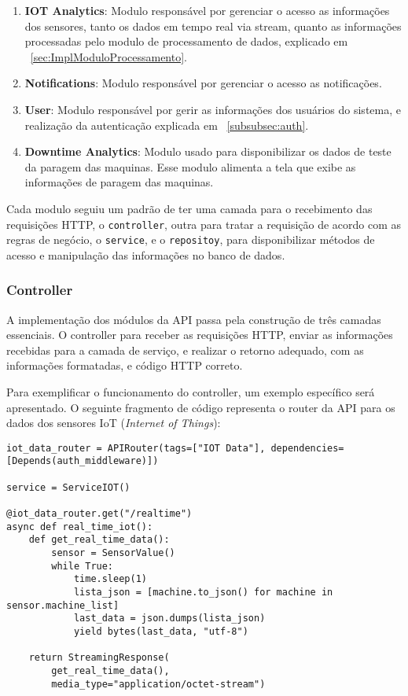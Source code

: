 \begin{enumerate}
    \item \textbf{IOT Analytics}: Modulo responsável por gerenciar o acesso as informações dos sensores, tanto os dados em tempo real via stream, quanto as informações processadas pelo modulo de processamento de dados, explicado em ~\ref{sec:ImplModuloProcessamento}.
    \item \textbf{Notifications}: Modulo responsável por gerenciar o acesso as notificações.
    \item \textbf{User}: Modulo responsável por gerir as informações dos usuários do sistema, e realização da autenticação explicada em ~\ref{subsubsec:auth}.
    \item \textbf{Downtime Analytics}: Modulo usado para disponibilizar os dados de teste da paragem das maquinas. Esse modulo alimenta a tela que exibe as informações de paragem das maquinas.

\end{enumerate}


Cada modulo seguiu um padrão de ter uma camada para o recebimento  das requisições HTTP, o \texttt{controller}, outra para tratar a requisição de acordo com as regras de negócio, o \texttt{service}, e o \texttt{repositoy}, para disponibilizar métodos de acesso e manipulação das informações no banco de dados.

\subsubsection{Controller}\label{subsubsec:controller}
A implementação dos módulos da API passa pela construção de três camadas essenciais. O controller para receber as requisições HTTP, enviar as informações recebidas para a camada de serviço, e realizar o retorno adequado, com as informações formatadas, e código HTTP correto.

Para exemplificar o funcionamento do controller, um exemplo específico será apresentado. O seguinte fragmento de código representa o router da API para os dados dos sensores IoT (\textit{Internet of Things}):

\begin{verbatim}
iot_data_router = APIRouter(tags=["IOT Data"], dependencies=[Depends(auth_middleware)])

service = ServiceIOT()

@iot_data_router.get("/realtime")
async def real_time_iot(): 
    def get_real_time_data():
        sensor = SensorValue()
        while True:
            time.sleep(1)
            lista_json = [machine.to_json() for machine in sensor.machine_list]
            last_data = json.dumps(lista_json)
            yield bytes(last_data, "utf-8")

    return StreamingResponse(
        get_real_time_data(),
        media_type="application/octet-stream")
\end{verbatim}

